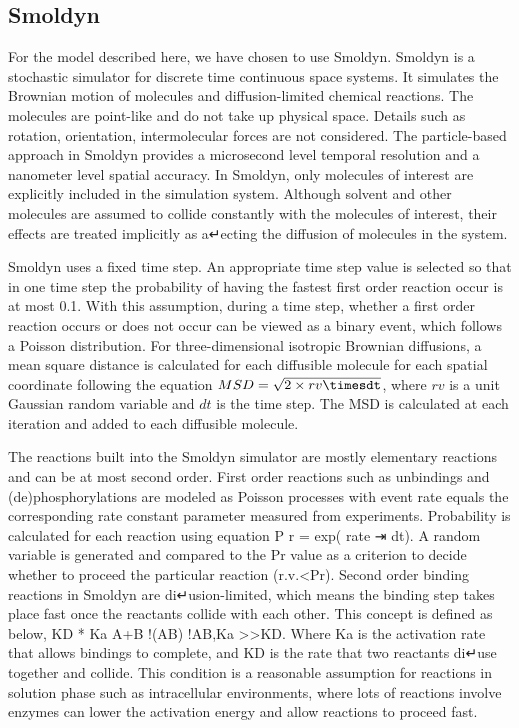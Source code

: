 \subsection{Smoldyn}

For the model described here, we have chosen to use Smoldyn. Smoldyn is a stochastic simulator for discrete time continuous space systems. It simulates the Brownian motion of molecules and diffusion-limited chemical reactions. The molecules are point-like and do not take up physical space. Details such as rotation, orientation, intermolecular forces are not considered. The particle-based approach in Smoldyn provides a microsecond level temporal resolution and a nanometer level spatial accuracy. In Smoldyn, only molecules of interest are explicitly included in the simulation system. Although solvent and other molecules are assumed to collide constantly with the molecules of interest, their effects are treated implicitly as a↵ecting the diffusion of molecules in the system.

Smoldyn uses a fixed time step. An appropriate time step value is selected so that in one time step the probability of having the fastest first order reaction occur is at most 0.1. With this assumption, during a time step, whether a first order reaction occurs or does not occur can be viewed as a binary event, which follows a Poisson distribution. For three-dimensional isotropic Brownian diffusions, a mean square distance is calculated for each diffusible molecule for each spatial coordinate following the equation $MSD = \sqrt{2\times rv\timesdt}$, where $rv$ is a unit Gaussian random variable and $dt$ is the time step. The MSD is calculated at each iteration and added to each diffusible molecule.

The reactions built into the Smoldyn simulator are mostly elementary reactions and can be at most second order. First order reactions such as unbindings and (de)phosphorylations are modeled as Poisson processes with event rate equals the corresponding rate constant parameter measured from experiments. Probability is calculated for each reaction using equation P r = exp( rate ⇥ dt). A random variable is generated and compared to the Pr value as a criterion to decide whether to proceed the particular reaction (r.v.<Pr). Second order binding reactions in Smoldyn are di↵usion-limited, which means the binding step takes place fast once
the reactants collide with each other. This concept is defined as below,
KD * Ka A+B  !(AB)   !AB,Ka >>KD.
Where Ka is the activation rate that allows bindings to complete, and KD is the rate that two reactants di↵use together and collide. This condition is a reasonable assumption for reactions in solution phase such as intracellular environments, where lots of reactions involve enzymes can lower the activation energy and allow reactions to proceed fast.

